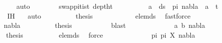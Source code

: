 \begin{isabellebody}
\ \ \ \ \ \ \ \ \isamarkupfalse%
\ {}{\isacharparenleft}{\kern0pt}{}{\isacharcomma}{\kern0pt}{}{\isacharparenright}{\kern0pt}\ \isamarkupfalse%
\ auto\isanewline
\ \ \ \ \ \ \isamarkupfalse%
\ swap{\isacharunderscore}{\kern0pt}pi{\isacharunderscore}{\kern0pt}t{}{\isacharunderscore}{\kern0pt}is{\isacharunderscore}{\kern0pt}t{}\ deptht{}\ \isanewline
\ \ \ \ \ \ \isamarkupfalse%
\ {\isachardoublequoteopen}{\isasymforall}\ a\ {\isasymin}\ ds\ {\isacharbrackleft}{\kern0pt}{\isacharbrackright}{\kern0pt}\ pi{\isachardot}{\kern0pt}\ nabla\ {\isasymturnstile}\ a\ {\isasymsharp}\ t{}{\isachardoublequoteclose}\isanewline
\ \ \ \ \ \ \ \ \isamarkupfalse%
\ {\isachardoublequoteopen}{}{\isachardot}{\kern0pt}IH{\isachardoublequoteclose}\ {}{\isacharparenleft}{\kern0pt}{}{\isacharcomma}{\kern0pt}{}{\isacharparenright}{\kern0pt}\ \isamarkupfalse%
\ auto\isanewline
\ \ \ \ \ \ \isamarkupfalse%
\ \isamarkupfalse%
\ {\isacharquery}{\kern0pt}thesis\ \isanewline
\ \ \ \ \ \ \ \ \isamarkupfalse%
\ {}{\isacharparenleft}{\kern0pt}{}{\isacharcomma}{\kern0pt}{}{\isacharcomma}{\kern0pt}{}{\isacharparenright}{\kern0pt}\ elem{\isacharunderscore}{\kern0pt}ds\ \isamarkupfalse%
\ fastforce\isanewline
\ \ \ \ \isamarkupfalse%
\isanewline
\ \ \ \ \ \ \isamarkupfalse%
\ {\isacharparenleft}{\kern0pt}{}\ nabla{\isacharparenright}{\kern0pt}\isanewline
\ \ \ \ \ \ \isamarkupfalse%
\ \isamarkupfalse%
\ {\isacharquery}{\kern0pt}thesis\ \isanewline
\ \ \ \ \ \ \ \ \isamarkupfalse%
\ blast\isanewline
\ \ \ \ \isamarkupfalse%
\isanewline
\ \ \ \ \ \ \isamarkupfalse%
\ {\isacharparenleft}{\kern0pt}{}\ a\ b\ nabla{\isacharparenright}{\kern0pt}\isanewline
\ \ \ \ \ \ \isamarkupfalse%
\ \isamarkupfalse%
\ {\isacharquery}{\kern0pt}thesis\isanewline
\ \ \ \ \ \ \ \ \isamarkupfalse%
\ elem{\isacharunderscore}{\kern0pt}ds\ \isamarkupfalse%
\ force\isanewline
\ \ \ \ \isamarkupfalse%
\isanewline
\ \ \ \ \ \ \isamarkupfalse%
\ {\isacharparenleft}{\kern0pt}{}\ pi{}\ pi{}\ X\ nabla{\isacharparenright}{\kern0pt}\isanewline

\end{isabellebody}
